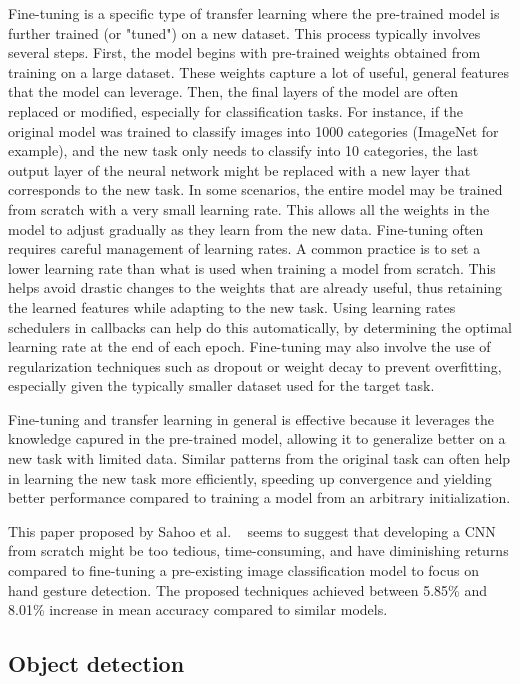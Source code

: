 \documentclass[12pt]{article}
\begin{document}
Fine-tuning is a specific type of transfer learning where the pre-trained model is further trained (or "tuned") on a new dataset. This process typically involves several steps. First, the model begins with pre-trained weights obtained from training on a large dataset. These weights capture a lot of useful, general features that the model can leverage. Then, the final layers of the model are often replaced or modified, especially for classification tasks. For instance, if the original model was trained to classify images into 1000 categories (ImageNet for example), and the new task only needs to classify into 10 categories, the last output layer of the neural network might be replaced with a new layer that corresponds to the new task. In some scenarios, the entire model may be trained from scratch with a very small learning rate. This allows all the weights in the model to adjust gradually as they learn from the new data.
Fine-tuning often requires careful management of learning rates. A common practice is to set a lower learning rate than what is used when training a model from scratch. This helps avoid drastic changes to the weights that are already useful, thus retaining the learned features while adapting to the new task. Using learning rates schedulers in callbacks can help do this automatically, by determining the optimal learning rate at the end of each epoch.
Fine-tuning may also involve the use of regularization techniques such as dropout or weight decay to prevent overfitting, especially given the typically smaller dataset used for the target task.

Fine-tuning and transfer learning in general is effective because it leverages the knowledge capured in the pre-trained model, allowing it to generalize better on a new task with limited data. Similar patterns from the original task can often help in learning the new task more efficiently, speeding up convergence and yielding better performance compared to training a model from an arbitrary initialization.

This paper proposed by Sahoo et al. ~\cite{sahoo2022real} seems to suggest that developing a CNN from scratch might be too tedious, time-consuming, and have diminishing returns compared to fine-tuning a pre-existing image classification model to focus on hand gesture detection. The proposed techniques achieved between 5.85\% and 8.01\% increase in mean accuracy compared to similar models.

\subsection{Object detection}
\end{document}
